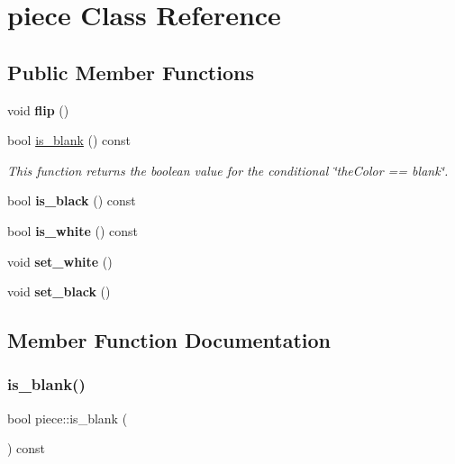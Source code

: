 \hypertarget{classpiece}{}\section{piece Class Reference}
\label{classpiece}
\subsection*{Public Member Functions}
\begin{DoxyCompactItemize}
\item 
\mbox{\label{classpiece_ab898c5827a5859e4cddc9d61a814a873}} 
void {\bfseries flip} ()
\item 
bool \mbox{\hyperlink{classpiece_aa1eda7729e0f3383a813fc6ccc4e7e3c}{is\+\_\+blank}} () const
\begin{DoxyCompactList}\small\item\em This function returns the boolean value for the conditional \char`\"{}the\+Color == blank\char`\"{}. \end{DoxyCompactList}\item 
\mbox{\label{classpiece_a103dccd216cb495d1c42b2465778be53}} 
bool {\bfseries is\+\_\+black} () const
\item 
\mbox{\label{classpiece_ae9dde29687fcb2b7badc6cb5395a13f2}} 
bool {\bfseries is\+\_\+white} () const
\item 
\mbox{\label{classpiece_a31480899f2a591fdb22d97933303e19d}} 
void {\bfseries set\+\_\+white} ()
\item 
\mbox{\label{classpiece_a273d63d07b6ea973b2fc4f7e1b56ea10}} 
void {\bfseries set\+\_\+black} ()
\end{DoxyCompactItemize}


\subsection{Member Function Documentation}
\mbox{\label{classpiece_aa1eda7729e0f3383a813fc6ccc4e7e3c}} 
\subsubsection{\texorpdfstring{is\+\_\+blank()}{is\_blank()}}
{\footnotesize\ttfamily bool piece\+::is\+\_\+blank (\begin{DoxyParamCaption}{ }\end{DoxyParamCaption}) const\hspace{0.3cm}{\ttfamily [inline]}}



